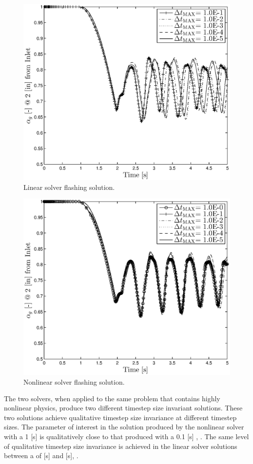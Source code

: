 \begin{figure}[h!tb]
\centering
\includegraphics[width=.6\textwidth]{plots/lin_flashing_al_2in.eps}
\caption{Linear solver flashing solution.}
\label{fig:cobra_mode_flashing}
\end{figure}

\begin{figure}[h!bt]
\centering
\includegraphics[width=.6\textwidth]{plots/nln_flashing_al_2in.eps}
\caption{Nonlinear solver flashing solution.}
\label{fig:nl_mode_flashing}
\end{figure}

The two solvers, when applied to the same problem that contains highly nonlinear physics, produce two different timestep size invariant solutions.
These two solutions achieve qualitative timestep size invariance at different timestep sizes.
The parameter of interest in the solution produced by the nonlinear solver with a 1 [s] \dtmax{} is qualitatively close to that produced with a 0.1 [s] \dtmax{}, .
The same level of qualitative timestep size invariance is achieved in the linear solver solutions between a \dtmax{} of  [s] and  [s], .

